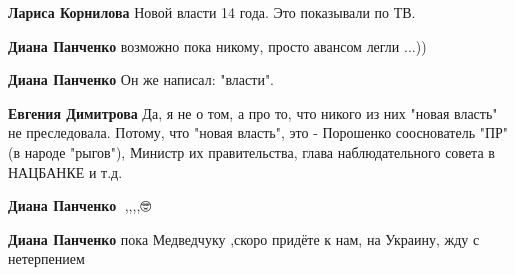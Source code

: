\begin{itemize}
\begin{itemize}
\textbf{Лариса Корнилова} Новой власти 14 года. Это показывали по ТВ.

 
\textbf{Диана Панченко} возможно пока никому, просто авансом легли ...))

 
\textbf{Диана Панченко} Он же написал: "власти".

 
\textbf{Евгения Димитрова} Да, я не о том, а про то, что никого из них "новая власть" не преследовала. Потому, что "новая власть", это - Порошенко сооснователь "ПР"(в народе "рыгов"), Министр их правительства, глава наблюдательного совета в НАЦБАНКЕ и т.д.

 
\textbf{Диана Панченко} 🤔,,,,🤓

 
\textbf{Диана Панченко} пока Медведчуку ,скоро придёте к нам, на Украину, жду с нетерпением

\end{itemize}

 

\end{itemize}
